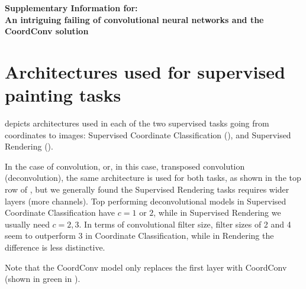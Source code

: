\documentclass{article}
\newcommand{\titl}{An intriguing failing of convolutional neural networks and the CoordConv solution}
\begin{document}
\beginsupplementary



\noindent\makebox[\linewidth]{\rule{\linewidth}{3.5pt}}

\begin{center}
	{\LARGE \bf Supplementary Information for:\\ \titl\par}
\end{center}
\noindent\makebox[\linewidth]{\rule{\linewidth}{1pt}}

\section{Architectures used for supervised painting tasks}

 depicts architectures used in each of the two supervised tasks going from coordinates to images: Supervised Coordinate Classification (), and Supervised Rendering ().

In the case of convolution, or, in this case, transposed convolution (deconvolution), the same architecture is used for both tasks, as shown in the top row of , but we generally found the Supervised Rendering tasks requires wider layers (more channels). Top performing deconvolutional models in Supervised Coordinate Classification have $c=1$ or $2$, while in Supervised Rendering we usually need $c=2,3$. In terms of convolutional filter size, filter sizes of 2 and 4 seem to outperform 3 in Coordinate Classification, while in Rendering the difference is less distinctive.

Note that the CoordConv model only replaces the first layer with CoordConv (shown in green in  ).













\end{document}
